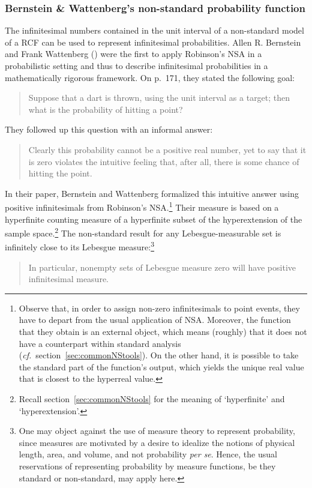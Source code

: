 \subsubsection*{Bernstein \& Wattenberg's non-standard probability function}
The infinitesimal numbers contained in the unit interval of a non-standard model of a RCF can be used to represent infinitesimal probabilities. Allen R. Bernstein and Frank Wattenberg () were the first to apply Robinson's NSA in a probabilistic setting and thus to describe infinitesimal probabilities in a mathematically rigorous framework. On p.~171, they stated the following goal:
\begin{quote}
Suppose that a dart is thrown, using the unit interval as a target; then what is the probability of hitting a point?
\end{quote}
They followed up this question with an informal answer:
\begin{quote}
Clearly this probability cannot be a positive real number, yet to say that it is zero violates the intuitive feeling that, after all, there is some chance of hitting the point.
\end{quote}
In their paper, Bernstein and Wattenberg formalized this intuitive answer using positive infinitesimals from Robinson's NSA.\footnote{Observe that, in order to assign non-zero infinitesimals to point events, they have to depart from the usual application of NSA. Moreover, the function that they obtain is an external object, which means (roughly) that it does not have a counterpart within standard analysis (\textit{cf.}\ section~\ref{sec:commonNStools}). On the other hand, it is possible to take the standard part of the function's output, which yields the unique real value that is closest to the hyperreal value.}
Their measure is based on a hyperfinite counting measure of a hyperfinite subset of the hyperextension of the sample space.\footnote{Recall section~\ref{sec:commonNStools} for the meaning of `hyperfinite' and `hyperextension'.}
The non-standard result for any Lebesgue-measurable set is infinitely close to its Lebesgue measure:\footnote{One may object against the use of measure theory to represent probability, since measures are motivated by a desire to idealize the notions of physical length, area, and volume, and not probability \textit{per se}. Hence, the usual reservations of representing probability by measure functions, be they standard or non-standard, may apply here.}
\begin{quote}
In particular, nonempty sets of Lebesgue measure zero will have positive infinitesimal measure.
\end{quote}
